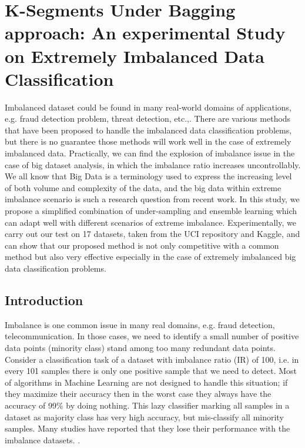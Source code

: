 \chapter{K-Segments Under Bagging approach: An experimental Study on Extremely Imbalanced Data Classification}

\ifpdf
    \graphicspath{{Chapter1/Figs/Raster/}{Chapter1/Figs/PDF/}{Chapter1/Figs/}}
\else
    \graphicspath{{Chapter1/Figs/Vector/}{Chapter1/Figs/}}
\fi

Imbalanced dataset could be found in many real-world domains of applications, e.g. fraud detection problem, threat detection, etc.,. There are various methods that have been proposed to handle the imbalanced data classification problems, but there is no guarantee those methods will work well in the case of extremely imbalanced data. Practically, we can find the explosion of imbalance issue in the case of big dataset analysis, in which the imbalance ratio increases uncontrollably. We all know that Big Data is a terminology used to express the increasing level of both volume and complexity of the data, and the big data within extreme imbalance scenario is such a research question from recent work. In this study, we propose a simplified combination of under-sampling and ensemble learning which can adapt well with different scenarios of extreme imbalance. Experimentally, we carry out our test on 17 datasets, taken from the UCI repository and Kaggle, and can show that our proposed method is not only competitive with a common method but also very effective especially in the case of extremely imbalanced big data classification problems.

\section{Introduction}

Imbalance is one common issue in many real domains, e.g. fraud detection, telecommunication. In those cases, we need to identify a small number of positive data points (minority class) stand among too many redundant data points. Consider a classification task of a dataset with imbalance ratio (IR) of 100, i.e. in every 101 samples there is only one positive sample that we need to detect. Most of algorithms in Machine Learning are not designed to handle this situation; if they maximize their accuracy then in the worst case they always have the accuracy of 99\% by doing nothing. This lazy classifier marking all samples in a dataset as majority class has very high accuracy, but mis-classify all minority samples. Many studies have reported that they lose their performance with the imbalance datasets. \cite{chen2004using,chen2005pruning,wang2006classification,hong2007kernel}.

